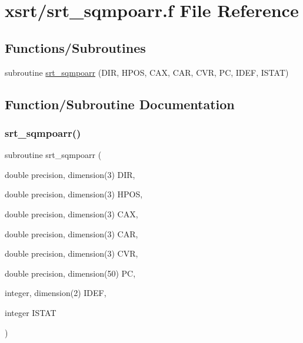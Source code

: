 \hypertarget{srt__sqmpoarr_8f}{}\section{xsrt/srt\+\_\+sqmpoarr.f File Reference}
\label{srt__sqmpoarr_8f}
\subsection*{Functions/\+Subroutines}
\begin{DoxyCompactItemize}
\item 
subroutine \hyperlink{srt__sqmpoarr_8f_a6534dbccee5d60b36b393422249c2fca}{srt\+\_\+sqmpoarr} (D\+IR, H\+P\+OS, C\+AX, C\+AR, C\+VR, PC, I\+D\+EF, I\+S\+T\+AT)
\end{DoxyCompactItemize}


\subsection{Function/\+Subroutine Documentation}
\mbox{\label{srt__sqmpoarr_8f_a6534dbccee5d60b36b393422249c2fca}} 
\subsubsection{\texorpdfstring{srt\+\_\+sqmpoarr()}{srt\_sqmpoarr()}}
{\footnotesize\ttfamily subroutine srt\+\_\+sqmpoarr (\begin{DoxyParamCaption}\item[{double precision, dimension(3)}]{D\+IR,  }\item[{double precision, dimension(3)}]{H\+P\+OS,  }\item[{double precision, dimension(3)}]{C\+AX,  }\item[{double precision, dimension(3)}]{C\+AR,  }\item[{double precision, dimension(3)}]{C\+VR,  }\item[{double precision, dimension(50)}]{PC,  }\item[{integer, dimension(2)}]{I\+D\+EF,  }\item[{integer}]{I\+S\+T\+AT }\end{DoxyParamCaption})}

